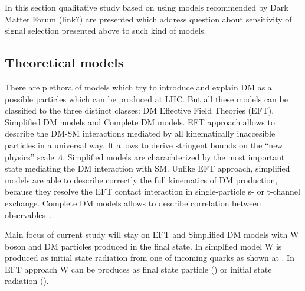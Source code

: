 In this section qualitative study based on using models recommended by Dark Matter Forum (link?) are presented 
which address question about sensitivity of signal selection presented above to such kind of models.



\subsection{Theoretical models}

There are plethora of models which try to introduce and explain DM as a possible particles which can be produced at LHC. 
But all these models can be classified to the three distinct classes: DM Effective Field Theories (EFT), Simplified DM models 
and Complete DM models. EFT approach allows to describe the DM-SM interactions mediated by all 
kinematically inaccesible particles in a universal way. 
It allows to derive stringent bounds on the ``new physics'' scale $\Lambda$. 
Simplified models are charachterized by the most important state mediating the DM interaction with SM. Unlike EFT approach,
simplified models are able to describe correctly the full kinematics of DM production, because they resolve the EFT contact interaction in single-particle 
s- or t-channel exchange. Complete DM models allows to describe correlation between observables~\cite{arXiv:1506.03116}.

Main focus of current study will stay on EFT and Simplified DM models with W boson and DM particles produced in the final state. 
In simplfied model W is produced as initial state radiation from one of incoming quarks as shown at . 
In EFT approach W can be produces as final state particle () or initial state radiation ().





